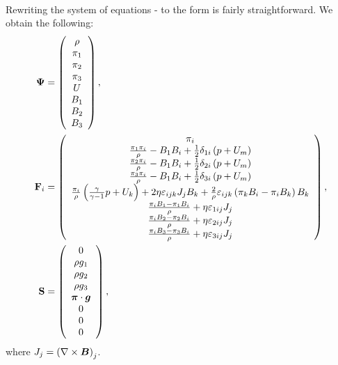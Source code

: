 \paragraph{}
Rewriting the system of equations  -  to the form  is fairly straightforward.
We obtain the following:
\begin{align}
\mathrm{\mathbf{\Psi}} & =  \left(\begin{array}{c}\rho \\ \pi_1 \\ \pi_2 \\ \pi_3 \\ U \\ B_1 \\ B_2 \\ B_3 \\ \end{array}\right),\\\mathrm{\mathbf{F}}_i & =  \left(\begin{array}{c} \pi_i \\ \frac{\pi_1 \pi_i}{\rho} - B_1 B_i + \frac12 \delta_{1i} \left( p + U_m\right) \\ \frac{\pi_2 \pi_i}{\rho} - B_1 B_i + \frac12 \delta_{2i} \left( p + U_m\right) \\ \frac{\pi_3 \pi_i}{\rho} - B_1 B_i + \frac12 \delta_{3i} \left( p + U_m\right) \\ \frac{\pi_i}{\rho} \left( \frac{\gamma}{\gamma - 1} p + U_k\right) + 2\eta\varepsilon_{ijk} J_j B_k + \frac{2}{\rho} \varepsilon_{ijk} \left( \pi_k B_i - \pi_i B_k\right) B_k  \\ \frac{\pi_i B_1 - \pi_1 B_i}{\rho} + \eta \varepsilon_{1ij} J_j \\ \frac{\pi_i B_2 - \pi_2 B_i}{\rho} + \eta \varepsilon_{2ij} J_j \\ \frac{\pi_i B_3 - \pi_3 B_i}{\rho} + \eta \varepsilon_{3ij} J_j \\ \end{array}\right),\\
\mathrm{\mathbf{S}} & =  \left(\begin{array}{c}0 \\ \rho g_1 \\ \rho g_2 \\ \rho g_3 \\ \mbox{\boldmath $\pi$} \cdot \mbox{\boldmath $g$} \\ 0 \\ 0 \\ 0 \\ \end{array}\right),
\end{align}
where $J_j = \left(\nabla\times\mbox{\boldmath $B$}\right)_j$.
